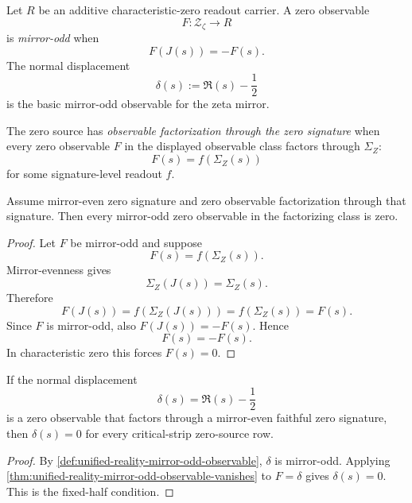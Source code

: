 \begin{definition}
\label{def:unified-reality-mirror-odd-observable}
Let $R$ be an additive characteristic-zero readout carrier.  A zero
observable
$$
F:\mathcal Z_{\zeta}\to R
$$
is \emph{mirror-odd} when
$$
F(J(s))=-F(s).
$$
The normal displacement
$$
\delta(s):=\Re(s)-\frac12
$$
is the basic mirror-odd observable for the zeta mirror.
\end{definition}

\begin{definition}
\label{def:unified-reality-zero-observable-factorization}
The zero source has \emph{observable factorization through the zero
signature} when every zero observable $F$ in the displayed observable
class factors through $\Sigma_Z$:
$$
F(s)=f(\Sigma_Z(s))
$$
for some signature-level readout $f$.
\end{definition}

\begin{theorem}
\label{thm:unified-reality-mirror-odd-observable-vanishes}
Assume mirror-even zero signature and zero observable factorization
through that signature.  Then every mirror-odd zero observable in the
factorizing class is zero.
\end{theorem}

\begin{proof}
Let $F$ be mirror-odd and suppose
$$
F(s)=f(\Sigma_Z(s)).
$$
Mirror-evenness gives
$$
\Sigma_Z(J(s))=\Sigma_Z(s).
$$
Therefore
$$
F(J(s))
=
f(\Sigma_Z(J(s)))
=
f(\Sigma_Z(s))
=
F(s).
$$
Since $F$ is mirror-odd, also $F(J(s))=-F(s)$.  Hence
$$
F(s)=-F(s).
$$
In characteristic zero this forces $F(s)=0$.
\end{proof}

\begin{corollary}
\label{cor:unified-reality-normal-displacement-vanishes-signature-closure}
If the normal displacement
$$
\delta(s)=\Re(s)-\frac12
$$
is a zero observable that factors through a mirror-even faithful zero
signature, then $\delta(s)=0$ for every critical-strip zero-source row.
\end{corollary}

\begin{proof}
By
\autoref{def:unified-reality-mirror-odd-observable}, $\delta$ is
mirror-odd.  Applying
\autoref{thm:unified-reality-mirror-odd-observable-vanishes} to
$F=\delta$ gives $\delta(s)=0$.  This is the fixed-half condition.
\end{proof}

